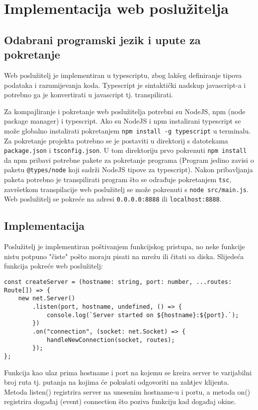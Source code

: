 \documentclass[]{foi} %
\begin{document}
\chapter{Implementacija web poslužitelja}

\section{Odabrani programski jezik i upute za pokretanje}
Web poslužitelj je implementiran u typescriptu, zbog lakšeg definiranje tipova podataka
i razumijevanja koda. Typescript je sintaktički nadskup javascript-a i potrebno ga je
konvertirati u javascript tj. transpilirati.

Za kompajliranje i pokretanje web poslužitelja potrebni su NodeJS, npm (node package manager) i typescript.
Ako su NodeJS i npm instalirani typescript se može globalno instalirati pokretanjem \texttt{npm install -g typescript}
u terminalu. Za pokretanje projekta potrebno se je postaviti u direktorij s datotekama \texttt{package.json} i
\texttt{tsconfig.json}. U tom direktoriju prvo pokrenuti \texttt{npm install} da npm pribavi potrebne pakete
za pokretanje programa (Program jedino zavisi o paketu \texttt{@types/node} koji sadrži NodeJS tipove za typescript).
Nakon pribavljanja paketa potrebno je transpilirati program što se odrađuje pokretanjem \texttt{tsc}, završetkom
transpilacije web poslužitelj se može pokrenuti s \texttt{node src/main.js}. Web poslužitelj se pokreće na
adresi \texttt{0.0.0.0:8888} ili \texttt{localhost:8888}.

\section{Implementacija}

Poslužitelj je implementiran poštivanjem funkcijskog pristupa, no neke funkcije nistu
potpuno "čiste" pošto moraju pisati na mrežu ili čitati sa diska. Slijedeća funkcija
pokreće web poslužitelj:
\begin{lstlisting}[caption={Funkcija za pokretanje web poslužitelja}, label=lst:pokretanje]
const createServer = (hostname: string, port: number, ...routes: Route[]) => {
    new net.Server()
        .listen(port, hostname, undefined, () => {
            console.log(`Server started on ${hostname}:${port}.`);
        })
        .on("connection", (socket: net.Socket) => {
            handleNewConnection(socket, routes);
        });
};
\end{lstlisting}
Funkcija kao ulaz prima hostname i port na kojemu se kreira server te varijabilni broj
ruta tj. putanja na kojima će pokušati odgovoriti na zahtjev klijenta. Metoda listen()
registrira server na unesenim hostname-u i portu, a metoda on() registrira događaj (event)
connection što poziva funkciju kad događaj okine.
\end{document}
